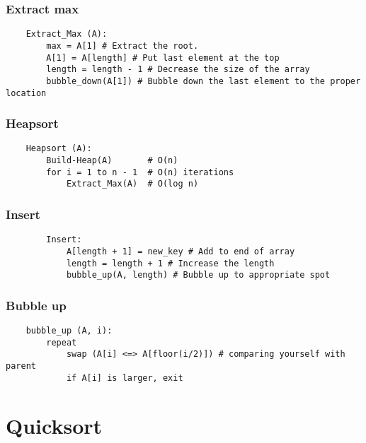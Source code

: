 \documentclass{article}
\begin{document}
\subsubsection{Extract max}
\begin{algo}
    \begin{lstlisting}
    Extract_Max (A): 
        max = A[1] # Extract the root.
        A[1] = A[length] # Put last element at the top
        length = length - 1 # Decrease the size of the array
        bubble_down(A[1]) # Bubble down the last element to the proper location
    \end{lstlisting}
\end{algo}

\subsubsection{Heapsort}
\begin{algo}
    \begin{lstlisting}
    Heapsort (A):
        Build-Heap(A)       # O(n)
        for i = 1 to n - 1  # O(n) iterations
            Extract_Max(A)  # O(log n)
    \end{lstlisting}
\end{algo}

\subsubsection{Insert}
\begin{algo}
    \begin{lstlisting}
        Insert:
            A[length + 1] = new_key # Add to end of array 
            length = length + 1 # Increase the length
            bubble_up(A, length) # Bubble up to appropriate spot
    \end{lstlisting}
\end{algo}

\subsubsection{Bubble up}
\begin{algo}
    \begin{lstlisting}
    bubble_up (A, i):
        repeat
            swap (A[i] <=> A[floor(i/2)]) # comparing yourself with parent
            if A[i] is larger, exit
    \end{lstlisting}
\end{algo}
\newpage

\section{Quicksort}
\begin{summary}
    
\end{summary}
\end{document}
